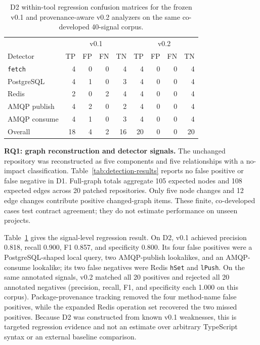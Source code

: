 \documentclass[conference]{IEEEtran}
\begin{document}
\begin{table}[t]
  \caption{D2 within-tool regression confusion matrices for the frozen v0.1 and provenance-aware v0.2 analyzers on the same co-developed 40-signal corpus.}
  \label{tab:pattern-results}
  \centering
  \small
  \begin{tabular}{lrrrrrrrr}
    \hline
    & \multicolumn{4}{c}{v0.1} & \multicolumn{4}{c}{v0.2} \\
    Detector & TP & FP & FN & TN & TP & FP & FN & TN \\
    \hline
    \texttt{fetch} & 4 & 0 & 0 & 4 & 4 & 0 & 0 & 4 \\
    PostgreSQL & 4 & 1 & 0 & 3 & 4 & 0 & 0 & 4 \\
    Redis & 2 & 0 & 2 & 4 & 4 & 0 & 0 & 4 \\
    AMQP publish & 4 & 2 & 0 & 2 & 4 & 0 & 0 & 4 \\
    AMQP consume & 4 & 1 & 0 & 3 & 4 & 0 & 0 & 4 \\
    \hline
    Overall & 18 & 4 & 2 & 16 & 20 & 0 & 0 & 20 \\
    \hline
  \end{tabular}
\end{table}

\textbf{RQ1: graph reconstruction and detector signals.}
The unchanged repository was reconstructed as five components and five relationships with a no-impact classification. Table~\ref{tab:detection-results} reports no false positive or false negative in D1. Full-graph totals aggregate 105 expected nodes and 108 expected edges across 20 patched repositories. Only five node changes and 12 edge changes contribute positive changed-graph items. These finite, co-developed cases test contract agreement; they do not estimate performance on unseen projects.

Table~\ref{tab:pattern-results} gives the signal-level regression result. On D2, v0.1 achieved precision 0.818, recall 0.900, F1 0.857, and specificity 0.800. Its four false positives were a PostgreSQL-shaped local query, two AMQP-publish lookalikes, and an AMQP-consume lookalike; its two false negatives were Redis \texttt{hSet} and \texttt{lPush}. On the same annotated signals, v0.2 matched all 20 positives and rejected all 20 annotated negatives (precision, recall, F1, and specificity each 1.000 on this corpus). Package-provenance tracking removed the four method-name false positives, while the expanded Redis operation set recovered the two missed positives. Because D2 was constructed from known v0.1 weaknesses, this is targeted regression evidence and not an estimate over arbitrary TypeScript syntax or an external baseline comparison.
\end{document}
